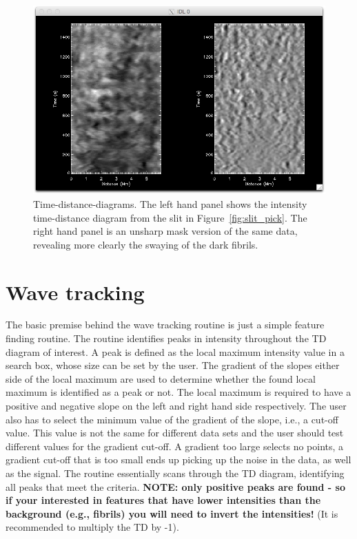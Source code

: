 \documentclass{article}
\begin{document}
\begin{figure}[!tp]

\centering

\includegraphics[scale=0.6, clip=true, viewport=0.5cm 0.cm 29.cm 16.7cm]{slit_example.png}  

\caption{Time-distance-diagrams. The left hand panel shows the intensity time-distance diagram from the slit in Figure~\ref{fig:slit_pick}. The right hand panel is an unsharp mask version of the same data, revealing more clearly the swaying of the dark fibrils.
}\label{fig:slit_pick2}

\end{figure}


\section{Wave tracking}
The basic premise behind the wave tracking routine is just a simple feature finding routine. The routine identifies peaks in intensity throughout the TD diagram of interest. A peak is defined as the local maximum intensity value in a search box, whose size can be set by the user. The gradient of the slopes either side of the local maximum are used to determine whether the found local maximum is identified as a peak or not. The local maximum is required to have a positive and negative slope on the left and right hand side respectively. The user also has to select the minimum value of the gradient of the slope, i.e., a cut-off value. This value is not the same for different data sets and the user should test different values for the gradient cut-off. A gradient too large selects no points, a gradient cut-off that is too small ends up picking up the noise in the data, as well as the signal. The routine essentially scans through the TD diagram, identifying all peaks that meet the criteria. \textbf{NOTE: only positive peaks are found - so if your interested in features that have lower intensities than the background (e.g., fibrils) you will need to invert the intensities!} (It is recommended to multiply the TD by -1).
\end{document}

